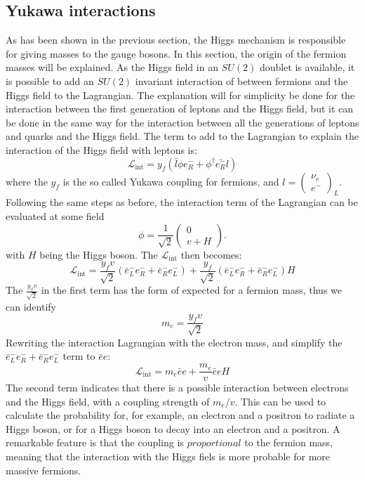 \subsection*{Yukawa interactions}\label{sec:yukawa}
\noindent\justify
As has been shown in the previous section, the Higgs mechanism is responsible for giving masses to the gauge bosons. In this section, the origin of the fermion masses will be explained.
As the Higgs field in an $SU(2)$ doublet is available, it is possible to add an $SU(2)$ invariant interaction of between fermions and the Higgs field to the Lagrangian. 
The explanation will for simplicity be done for the interaction between the first generation of leptons and the Higgs field, but it can be done in the same way for the interaction between all the generations of leptons and quarks and the Higgs field. 
The term to add to the Lagrangian to explain the interaction of the Higgs field with leptons is:
\begin{equation}
\mathcal{L}_{\mathrm{int}}=y_{f}(\bar{l}\phi e^{-}_{R}+\phi^{\dagger}\bar{e^{-}_{R}}l)
\label{eq:yf}
\end{equation}
where the $y_{f}$ is the so called Yukawa coupling for fermions, and $l=\begin{pmatrix}\nu_{e}  \\ e^{-}\end{pmatrix}_{L}$. 
Following the same steps as before, the interaction term of the Lagrangian can be evaluated at some field  
\begin{equation}
\phi=\frac{1}{\sqrt{2}}\begin{pmatrix} 0  \\ v+H\end{pmatrix}. 
\end{equation}
with $H$ being the Higgs boson. The $\mathcal{L}_{\mathrm{int}}$ then becomes:
\begin{equation}
\mathcal{L}_{\mathrm{int}}=\frac{y_{f}v}{\sqrt{2}}(\bar{e}^{-}_{L}e^{-}_{R}+\bar{e}_{R}^{-}e^{-}_{L})+ \frac{y_{f}}{\sqrt{2}}(\bar{e}^{-}_{L} e^{-}_{R}+\bar{e}_{R}^{-}e^{-}_{L})H
\end{equation}
The $\frac{y_{f}v}{\sqrt{2}}$ in the first term has the form of expected for a fermion mass, thus we can identify 
\begin{equation}
m_{e}=\frac{y_{f}v}{\sqrt{2}}
\end{equation}
Rewriting the interaction Lagrangian with the electron mass, and simplify the $\bar{e}^{-}_{L}e^{-}_{R}+\bar{e}_{R}^{-}e^{-}_{L}$ term to $\bar{e}e$:
\begin{equation}
\mathcal{L}_{\mathrm{int}}=m_{e}\bar{e}e+ \frac{m_{e}}{v}\bar{e}eH
\end{equation}
The second term indicates that there is a possible interaction between electrons and the Higgs field, with a coupling strength of $m_{e}/v$. 
This can be used to calculate the probability for, for example, an electron and a positron to radiate a Higgs boson, or for a Higgs boson to decay into an electron and a positron. 
A remarkable feature is that the coupling is $proportional$ to the fermion mass, meaning that the interaction with the Higgs fiels is more probable for more massive fermions. 
